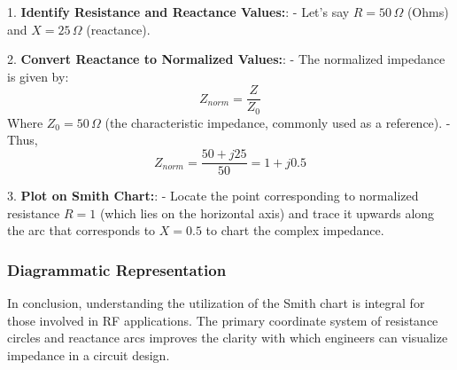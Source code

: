 1. \textbf{Identify Resistance and Reactance Values:}:
    - Let’s say \( R = 50 \, \Omega \) (Ohms) and \( X = 25 \, \Omega \) (reactance).
  
2. \textbf{Convert Reactance to Normalized Values:}:
    - The normalized impedance is given by:
    \[
    Z_{norm} = \frac{Z}{Z_0}
    \]
    Where \( Z_0 = 50 \, \Omega \) (the characteristic impedance, commonly used as a reference).
    - Thus,
    \[
    Z_{norm} = \frac{50 + j25}{50} = 1 + j0.5
    \]

3. \textbf{Plot on Smith Chart:}:
    - Locate the point corresponding to normalized resistance \( R = 1 \) (which lies on the horizontal axis) and trace it upwards along the arc that corresponds to \( X = 0.5 \) to chart the complex impedance.

\subsubsection{Diagrammatic Representation}

\begin{center}
\end{center}

In conclusion, understanding the utilization of the Smith chart is integral for those involved in RF applications. The primary coordinate system of resistance circles and reactance arcs improves the clarity with which engineers can visualize impedance in a circuit design.
